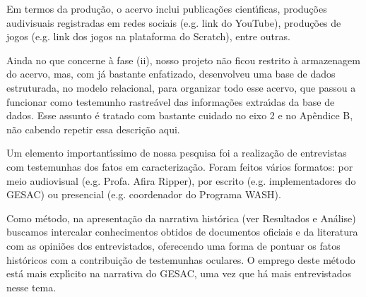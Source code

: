 \documentclass[
12pt,		%
openright,	%
twoside,  %
a4paper,			%
chapter=TITLE,		%
english,			%
french,				%
spanish,			%
brazil				%
]{USPSC-classe/USPSC}
\begin{document}
Em termos da produ\c{c}\~ao, o acervo inclui publica\c{c}\~oes cient\'{\i}ficas, produ\c{c}\~oes audivisuais registradas em redes sociais (e.g. link do YouTube), produ\c{c}\~oes de jogos (e.g. link dos jogos na plataforma do Scratch), entre outras.

















Ainda no que concerne \`a fase (ii), nosso projeto n\~ao ficou restrito \`a armazenagem do acervo, mas, com j\'a bastante enfatizado, desenvolveu uma base de dados estruturada, no modelo relacional, para organizar todo esse acervo, que passou a funcionar como testemunho rastre\'avel das informa\c{c}\~oes extra\'{\i}das da base de dados. Esse assunto \'e tratado com bastante cuidado no eixo 2 e no Ap\^endice B, n\~ao cabendo repetir essa descri\c{c}\~ao aqui.

















Um elemento important\'{\i}ssimo de nossa pesquisa foi a realiza\c{c}\~ao de entrevistas com testemunhas dos fatos em caracteriza\c{c}\~ao. Foram feitos v\'arios formatos: por meio audiovisual (e.g. Profa. Afira Ripper), por escrito (e.g. implementadores do GESAC) ou presencial (e.g. coordenador do Programa WASH).

















Como m\'etodo, na apresenta\c{c}\~ao da narrativa hist\'orica (ver Resultados e An\'alise) buscamos intercalar conhecimentos obtidos de documentos oficiais e da literatura com as opini\~oes dos entrevistados, oferecendo uma forma de pontuar os fatos hist\'oricos com a contribui\c{c}\~ao de testemunhas oculares. O emprego deste m\'etodo est\'a mais expl\'{\i}cito na narrativa do GESAC, uma vez que h\'a mais entrevistados nesse tema.
\end{document}
